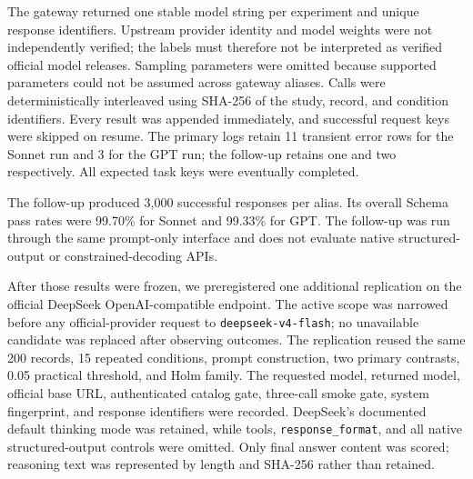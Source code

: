 \documentclass[10pt]{article}
\begin{document}
\begin{table}[t]
\caption{Primary 100-record study systems and operational summary.}
\label{tab:markdown-1}
\centering
{}
\end{table}
The gateway returned one stable model string per experiment and unique response identifiers. Upstream provider identity and model weights were not independently verified; the labels must therefore not be interpreted as verified official model releases. Sampling parameters were omitted because supported parameters could not be assumed across gateway aliases. Calls were deterministically interleaved using SHA-256 of the study, record, and condition identifiers. Every result was appended immediately, and successful request keys were skipped on resume. The primary logs retain 11 transient error rows for the Sonnet run and 3 for the GPT run; the follow-up retains one and two respectively. All expected task keys were eventually completed.

The follow-up produced 3,000 successful responses per alias. Its overall Schema pass rates were 99.70\% for Sonnet and 99.33\% for GPT. The follow-up was run through the same prompt-only interface and does not evaluate native structured-output or constrained-decoding APIs.

After those results were frozen, we preregistered one additional replication on the official DeepSeek OpenAI-compatible endpoint. The active scope was narrowed before any official-provider request to \texttt{deepseek-v4-flash}; no unavailable candidate was replaced after observing outcomes. The replication reused the same 200 records, 15 repeated conditions, prompt construction, two primary contrasts, 0.05 practical threshold, and Holm family. The requested model, returned model, official base URL, authenticated catalog gate, three-call smoke gate, system fingerprint, and response identifiers were recorded. DeepSeek's documented default thinking mode was retained, while tools, \texttt{response\_format}, and all native structured-output controls were omitted. Only final answer content was scored; reasoning text was represented by length and SHA-256 rather than retained.
\end{document}
